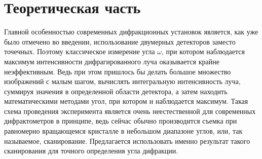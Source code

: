 \section{Теоретическая часть}

Главной особенностью современных дифракционных установок является, как уже было отмечено во введении, использование двумерных детекторов заместо точечных.
Поэтому классическое измерение угла $\omega$, при котором наблюдается максимум интенсивности дифрагированного луча оказывается крайне неэффективным.
Ведь при этом пришлось бы делать большое множество изображений с малым шагом, вычислять интегральную интенсивность луча, суммируя значения в определенной области детектора, а затем находить математическими методами угол, при котором и наблюдается максимум.
Такая схема проведения эксперимента является очень неестественной для современных дифрактометров в принципе, ведь сейчас обычно производится съемка при равномерно вращающемся кристалле в небольшом диапазоне углов, или, так называемое, сканирование.
Предлагается использовать именно результат такого сканирования для точного определения угла дифракции.